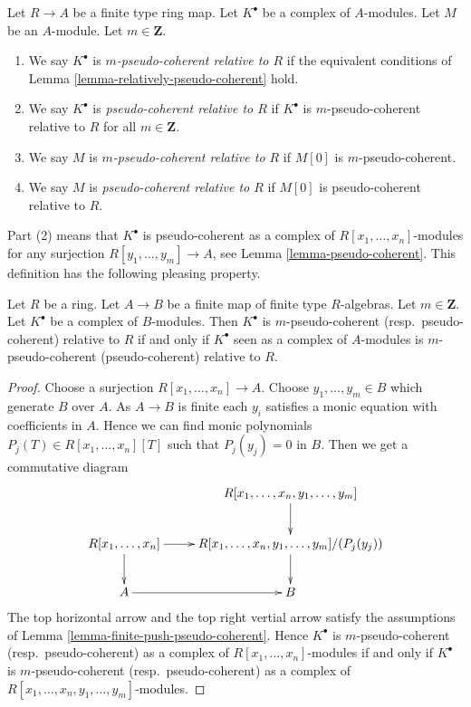 \begin{definition}
\label{definition-relatively-pseudo-coherent}
Let $R \to A$ be a finite type ring map.
Let $K^\bullet$ be a complex of $A$-modules.
Let $M$ be an $A$-module.
Let $m \in \mathbf{Z}$.
\begin{enumerate}
\item We say $K^\bullet$ is {\it $m$-pseudo-coherent relative to $R$}
if the equivalent conditions of
Lemma \ref{lemma-relatively-pseudo-coherent}
hold.
\item We say $K^\bullet$ is {\it pseudo-coherent relative to $R$}
if $K^\bullet$ is $m$-pseudo-coherent relative to $R$ for all
$m \in \mathbf{Z}$.
\item We say $M$ is {\it $m$-pseudo-coherent relative to $R$}
if $M[0]$ is $m$-pseudo-coherent.
\item We say $M$ is {\it pseudo-coherent relative to $R$}
if $M[0]$ is pseudo-coherent relative to $R$.
\end{enumerate}
\end{definition}

\noindent
Part (2) means that $K^\bullet$ is pseudo-coherent as a complex
of $R[x_1, \ldots, x_n]$-modules for any surjection
$R[y_1, \ldots, y_m] \to A$, see
Lemma \ref{lemma-pseudo-coherent}.
This definition has the following pleasing property.

\begin{lemma}
\label{lemma-finite-extension-pseudo-coherent}
Let $R$ be a ring. Let $A \to B$ be a finite map of finite type $R$-algebras.
Let $m \in \mathbf{Z}$. Let $K^\bullet$ be a complex of $B$-modules.
Then $K^\bullet$ is $m$-pseudo-coherent (resp.\ pseudo-coherent)
relative to $R$ if and only if $K^\bullet$ seen as a complex of $A$-modules
is $m$-pseudo-coherent (pseudo-coherent) relative to $R$.
\end{lemma}

\begin{proof}
Choose a surjection $R[x_1, \ldots, x_n] \to A$.
Choose $y_1, \ldots, y_m \in B$ which generate $B$ over $A$.
As $A \to B$ is finite each $y_i$ satisfies a monic equation with
coefficients in $A$. Hence we can find monic polynomials
$P_j(T) \in R[x_1, \ldots, x_n][T]$ such that $P_j(y_j) = 0$ in $B$.
Then we get a commutative diagram
$$
\xymatrix{
& R[x_1, \ldots, x_n, y_1, \ldots, y_m] \ar[d] \\
R[x_1, \ldots, x_n] \ar[d] \ar[r] &
R[x_1, \ldots, x_n, y_1, \ldots, y_m]/(P_j(y_j)) \ar[d] \\
A \ar[r] & B
}
$$
The top horizontal arrow and the top right vertial arrow
satisfy the assumptions of
Lemma \ref{lemma-finite-push-pseudo-coherent}.
Hence $K^\bullet$ is $m$-pseudo-coherent (resp.\ pseudo-coherent) as a complex
of $R[x_1, \ldots, x_n]$-modules if and only if $K^\bullet$ is
$m$-pseudo-coherent (resp.\ pseudo-coherent) as a complex of
$R[x_1, \ldots, x_n, y_1, \ldots, y_m]$-modules.
\end{proof}

